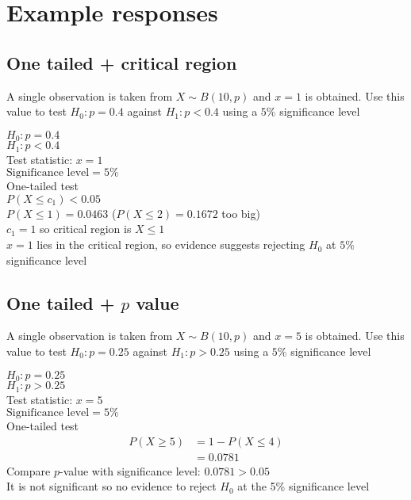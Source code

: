 \section{Example responses}
\subsection{One tailed + critical region}
\begin{example}
	A single observation is taken from $X\sim B(10, p)$ and $x=1$ is obtained. Use this value to test $H_0: p=0.4$ against $H_1:p<0.4$ using a $5\%$ significance level
\end{example}

\begin{solution}
	$H_0: p=0.4$\\
	$H_1:p<0.4$\\
	Test statistic: $x=1$\\
	$\text{Significance level} = 5\%$\\
	One-tailed test\\
	$P(X \leq c_1) < 0.05$\\
	$P(X \leq 1) = 0.0463$ ($P(X \leq 2) = 0.1672$ too big)\\
	$c_1 = 1$ so critical region is $X\leq 1$\\
	$x=1$ lies in the critical region, so evidence suggests rejecting $H_0$ at $5\%$ significance level
\end{solution}

\subsection{One tailed + $p$ value}
\begin{example}
	A single observation is taken from $X\sim B(10, p)$ and $x=5$ is obtained. Use this value to test $H_0: p=0.25$ against $H_1:p>0.25$ using a $5\%$ significance level
\end{example}

\begin{solution}
	$H_0: p=0.25$\\
	$H_1:p>0.25$\\
	Test statistic: $x=5$\\
	$\text{Significance level} = 5\%$\\
	One-tailed test
	\begin{align*}
		P(X\geq 5) &= 1-P(X\leq 4) \\ &= 0.0781
	\end{align*}
	Compare $p$-value with significance level: $0.0781 > 0.05$\\
	It is not significant so no evidence to reject $H_0$ at the 5\% significance level
\end{solution}

